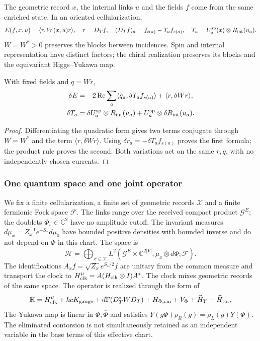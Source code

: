The geometric record $x$, the internal links $u$ and the fields $f$ come from the same enriched state. In an oriented cellularization,
\begin{equation}
E(f,x,u)=\langle r,W(x,u)r\rangle,\quad r=D_Tf,\quad
(D_Tf)_a=f_{t(a)}-T_af_{s(a)},\quad
T_a=U_a^{\rm sp}(x)\otimes R_{\rm int}(u_a).
\label{hmtcuatro:gea:energia-memoria}
\end{equation}
$W=W^*>0$ preserves the blocks between incidences. Spin and internal representation have distinct factors; the chiral realization preserves its blocks and the equivariant Higgs--Yukawa map.

\begin{proposition}
\label{hmtcuatro:gea:variacion} With fixed fields and $q=Wr$,
\begin{align}
\delta E&=-2\operatorname{Re}\sum_a
\langle q_a,\delta T_af_{s(a)}\rangle+\langle r,\delta Wr\rangle,
\label{hmtcuatro:gea:diferencial}\\
\delta T_a&=\delta U_a^{\rm sp}\otimes R_{\rm int}(u_a)
+U_a^{\rm sp}\otimes\delta R_{\rm int}(u_a).\nonumber
\end{align}
\end{proposition}
\begin{proof}
Differentiating the quadratic form gives two terms conjugate through $W=W^*$ and the term $\langle r,\delta Wr\rangle$. Using $\delta r_a=-\delta T_af_{s(a)}$ proves the first formula; the product rule proves the second. Both variations act on the same $r,q$, with no independently chosen currents.
\end{proof}

\subsubsection{One quantum space and one joint operator}
\label{hmtcuatro:gea:cuantica}

We fix a finite cellularization, a finite set of geometric records $\mathcal X$ and a finite fermionic Fock space $\mathcal F$. The links range over the received compact product $\mathcal G^E$; the doublets $\Phi_v\in\mathbb C^2$ have no amplitude cutoff. The invariant measures $d\mu_x=Z_x^{-1}e^{-S_x}d\mu_0$ have bounded positive densities with bounded inverse and do not depend on $\Phi$ in this chart. The space is
\[
\mathscr H=\bigoplus_{x\in\mathcal X}
L^2(\mathcal G^E\times\mathbb C^{2|V|},
\mu_x\otimes d\Phi;\mathcal F).
\]
The identifications $A_xf=\sqrt{Z_x}e^{S_x/2}f$ are unitary from the common measure and transport the clock to $H_{\rm clk}^{\mu}=A(H_{\rm clk}\otimes I)A^*$. The clock mixes geometric records of the same space. The operator is realized through the form of
\begin{equation}
\mathbb H=H_{\rm clk}^{\mu}+\hbar cK_{\rm gauge}
+d\Gamma(D_T^*WD_T)+H_{\Phi,\rm cin}+V_\Phi
+\widehat H_Y+\widehat H_{\rm tor}.
\label{hmtcuatro:gea:total}
\end{equation}
The Yukawa map is linear in $\Phi,\bar\Phi$ and satisfies $Y(g\Phi)\rho_R(g)=\rho_L(g)Y(\Phi)$. The eliminated contorsion is not simultaneously retained as an independent variable in the base terms of this effective chart.


